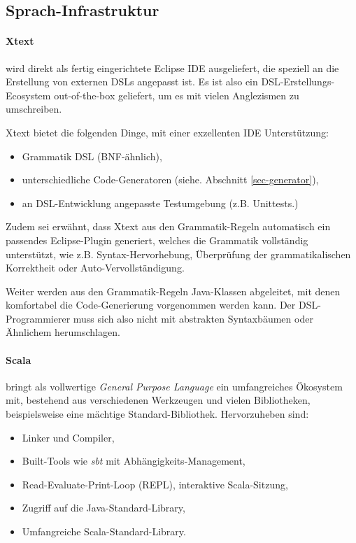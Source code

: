 \subsection{Sprach-Infrastruktur}\label{sec-infrastruktur}

\paragraph{Xtext} wird direkt als fertig eingerichtete Eclipse IDE
ausgeliefert, die speziell an die Erstellung von externen DSLs angepasst
ist. Es ist also ein DSL-Erstellungs-Ecosystem out-of-the-box geliefert,
um es mit vielen Anglezismen zu umschreiben.

Xtext bietet die folgenden Dinge, mit einer exzellenten IDE Unterstützung:

\begin{itemize}
  \item Grammatik DSL (BNF-ähnlich),
  \item unterschiedliche Code-Generatoren (siehe. Abschnitt \ref{sec-generator}),
  \item an DSL-Entwicklung angepasste Testumgebung (z.B. Unittests.)
\end{itemize}

Zudem sei erwähnt, dass Xtext aus den Grammatik-Regeln automatisch ein
passendes Eclipse-Plugin generiert, welches die Grammatik vollständig
unterstützt, wie z.B. Syntax-Hervorhebung, Überprüfung der grammatikalischen
Korrektheit oder Auto-Vervollständigung.

Weiter werden aus den Grammatik-Regeln Java-Klassen abgeleitet, mit denen
komfortabel die Code-Generierung vorgenommen werden kann. Der DSL-Programmierer
muss sich also nicht mit abstrakten Syntaxbäumen oder Ähnlichem herumschlagen.

\paragraph{Scala} bringt als vollwertige \emph{General Purpose Language}
ein umfangreiches Ökosystem mit, bestehend aus verschiedenen Werkzeugen
und vielen Bibliotheken, beispielsweise eine mächtige Standard-Bibliothek.
Hervorzuheben sind:

\begin{itemize}
  \item Linker und Compiler,
  \item Built-Tools wie \emph{sbt} mit Abhängigkeits-Management,
  \item Read-Evaluate-Print-Loop (REPL), interaktive Scala-Sitzung,
  \item Zugriff auf die Java-Standard-Library,
  \item Umfangreiche Scala-Standard-Library.
\end{itemize}

